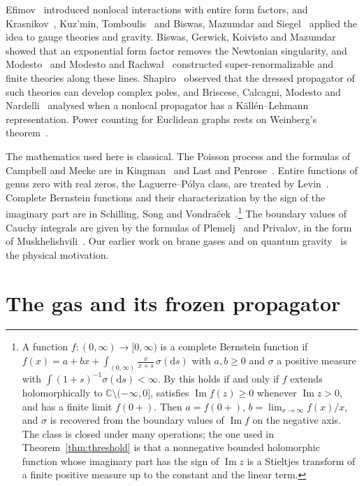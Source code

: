 \documentclass[aps,prd,twocolumn,superscriptaddress,nofootinbib,longbibliography,floatfix,amsmath,amssymb,10pt]{revtex4-2}
\theoremstyle{definition}
\theoremstyle{remark}
\newcommand{\C}{\mathbb{C}}
\newcommand{\dd}{\mathrm{d}}
\newcommand{\cut}{\C\setminus(-\infty,0]}
\DeclareMathOperator{\im}{Im}
\begin{document}
Efimov~\cite{Efimov1967} introduced nonlocal interactions with entire form
factors, and Krasnikov~\cite{Krasnikov1987}, Kuz'min, Tomboulis~\cite{Tomboulis1997}
and Biswas, Mazumdar and Siegel~\cite{BiswasMazumdarSiegel2006} applied the
idea to gauge theories and gravity. Biswas, Gerwick, Koivisto and
Mazumdar~\cite{BGKM2012} showed that an exponential form factor removes the
Newtonian singularity, and Modesto~\cite{Modesto2012} and Modesto and
Rachwa{\l}~\cite{ModestoRachwal2014} constructed super-renormalizable and
finite theories along these lines. Shapiro~\cite{Shapiro2015} observed that
the dressed propagator of such theories can develop complex poles, and
Briscese, Calcagni, Modesto and Nardelli~\cite{Briscese2024} analysed when a
nonlocal propagator has a K\"all\'en--Lehmann representation. Power counting
for Euclidean graphs rests on Weinberg's theorem~\cite{Weinberg1960}.

The mathematics used here is classical. The Poisson process and the formulas
of Campbell and Mecke are in Kingman~\cite{Kingman1993} and Last and
Penrose~\cite{LastPenrose2017}. Entire functions of genus zero with real
zeros, the Laguerre--P\'olya class, are treated by Levin~\cite{Levin1964}.
Complete Bernstein functions and their characterization by the sign of the
imaginary part are in Schilling, Song and
Vondra\v{c}ek~\cite{SSV2012}.\footnote{A function $f\colon(0,\infty)\to
[0,\infty)$ is a complete Bernstein function if
$f(x)=a+bx+\int_{(0,\infty)}\frac{x}{x+s}\,\sigma(\dd s)$ with $a,b\ge0$ and
$\sigma$ a positive measure with $\int(1+s)^{-1}\sigma(\dd s)<\infty$. By
\cite[Thms.~6.2 and 6.9]{SSV2012} this holds if and only if $f$ extends
holomorphically to $\cut$, satisfies $\im f(z)\ge0$ whenever $\im z>0$, and
has a finite limit $f(0+)$. Then $a=f(0+)$, $b=\lim_{x\to\infty}f(x)/x$,
and $\sigma$ is recovered from the boundary values of $\im f$ on the
negative axis. The class is closed under many operations; the one used in
Theorem~\ref{thm:threshold} is that a nonnegative bounded holomorphic function
whose imaginary part has the sign of $\im z$ is a Stieltjes transform of a
finite positive measure up to the constant and the linear term.} The boundary
values of Cauchy integrals are given by the formulas of
Plemelj~\cite{Plemelj1908} and Privalov, in the form of
Muskhelishvili~\cite{Muskhelishvili1953}. Our earlier work on brane gases and
on quantum gravity~\cite{SinghaRoy2025,Bhattacharjee2022,BCGarchive} is the
physical motivation.

\section{The gas and its frozen propagator}\label{sec:frozen}
\end{document}
